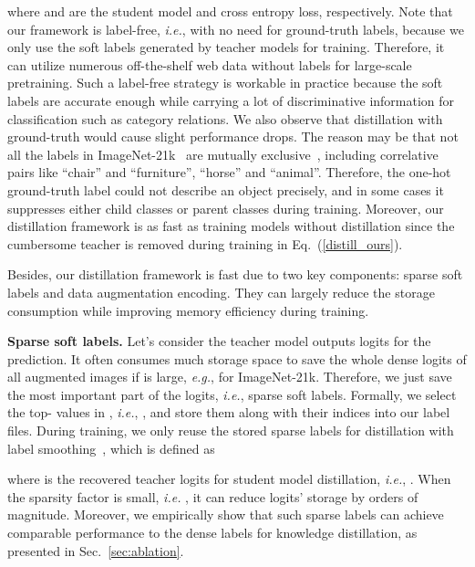 \documentclass[runningheads]{llncs}
\newcommand\REV[1]{#1}
\begin{document}
\vspace{-4mm}

where  and  are the student model and cross entropy loss, respectively.
Note that our framework is label-free, \emph{i.e.}, with no need for ground-truth labels, because we only use the soft labels generated by teacher models for training. 
Therefore, it can utilize numerous off-the-shelf web data without labels for large-scale pretraining. Such a label-free strategy is workable in practice because the soft labels are accurate enough while carrying a lot of discriminative information for classification such as category relations.
\REV{We also observe that distillation with ground-truth would cause slight performance drops. The reason may be that not all the labels in ImageNet-21k~\cite{imagenet} are mutually exclusive~\cite{ridnik2021imagenet}, including correlative pairs like ``chair'' and ``furniture'', ``horse'' and ``animal''. Therefore, the one-hot ground-truth label could not describe an object precisely, and in some cases it suppresses either child classes or parent classes during training.}
Moreover, our distillation framework is as fast as training models without distillation since the cumbersome teacher  is removed during training in Eq.~(\ref{distill_ours}).

Besides, our distillation framework is fast due to two key components: sparse soft labels and data augmentation encoding. They can largely reduce the storage consumption while improving memory efficiency during training.

\textbf{Sparse soft labels.}
Let's consider the teacher model outputs  logits for the prediction. It often consumes much storage space to save the whole dense logits of all augmented images if  is large, \emph{e.g.},  for ImageNet-21k. Therefore,
we just save the most important part of the logits, \emph{i.e.}, sparse soft labels. Formally, we select the top- values in , \emph{i.e.},  , and store them along with their indices  into our label files. During training, we only reuse the stored sparse labels for distillation with label smoothing~\cite{labelsmooth,labelsmooth_zhiqiang}, which is defined as
\vspace{-2mm}

where  is the recovered teacher logits for student model distillation, \emph{i.e.}, . When the sparsity factor  is small, \emph{i.e.} , it can reduce logits' storage by orders of magnitude. Moreover, we empirically show that such sparse labels can achieve comparable performance to the dense labels for knowledge distillation, as presented in Sec.~\ref{sec:ablation}.
\end{document}
